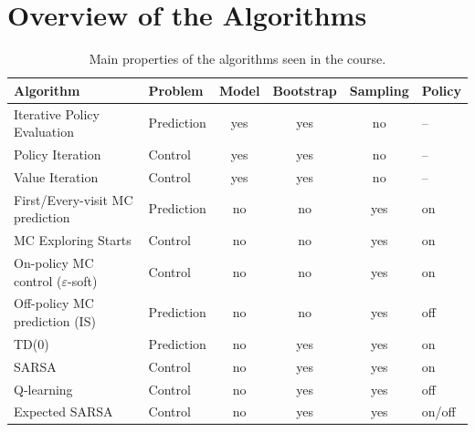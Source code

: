 \section{Overview of the Algorithms}
\begin{table}[H]
\centering
\small
\begin{tabularx}{\textwidth}{@{}>{\raggedright\arraybackslash}X l c c c l@{}}
\toprule
\textbf{Algorithm} & \textbf{Problem} & \textbf{Model} & \textbf{Bootstrap} & \textbf{Sampling} & \textbf{Policy} \\
\midrule
Iterative Policy Evaluation & Prediction & yes & yes & no & -- \\
Policy Iteration & Control & yes & yes & no & -- \\
Value Iteration & Control & yes & yes & no & -- \\
\midrule
First/Every-visit MC prediction & Prediction & no & no & yes & on \\
MC Exploring Starts & Control & no & no & yes & on \\
On-policy MC control ($\varepsilon$-soft) & Control & no & no & yes & on \\
Off-policy MC prediction (IS) & Prediction & no & no & yes & off \\
\midrule
TD(0) & Prediction & no & yes & yes & on \\
SARSA & Control & no & yes & yes & on \\
Q-learning & Control & no & yes & yes & off \\
Expected SARSA & Control & no & yes & yes & on/off \\
\bottomrule
\end{tabularx}
\caption{Main properties of the algorithms seen in the course.}
\label{tab:algo-overview}
\end{table}

